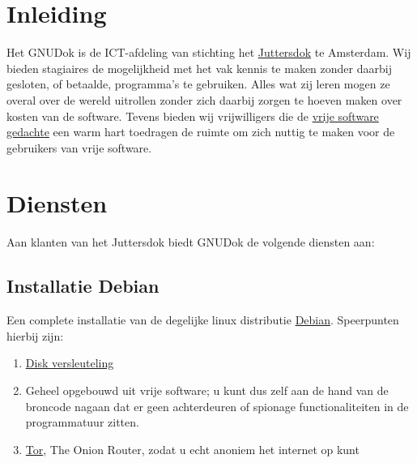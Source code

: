 
\section{Inleiding}

Het GNUDok is de ICT-afdeling van stichting het \href{http://www.juttersdok.nl/}{Juttersdok} te Amsterdam. Wij bieden stagiaires de mogelijkheid met het vak kennis te maken zonder daarbij gesloten, of betaalde, programma's te gebruiken. Alles wat zij leren mogen ze overal over de wereld uitrollen zonder zich daarbij zorgen te hoeven maken over kosten van de software. Tevens bieden wij vrijwilligers die de \href{http://www.fsf.org/}{vrije software gedachte} een warm hart toedragen de ruimte om zich nuttig te maken voor de gebruikers van vrije software.

\section{Diensten}

Aan klanten van het Juttersdok biedt GNUDok de volgende diensten aan:

\subsection{Installatie Debian}

Een complete installatie van de degelijke linux distributie \href{https://www.debian.org/}{Debian}.
Speerpunten hierbij zijn:

\begin{enumerate}
	\item \href{https://wiki.archlinux.org/index.php/Disk_encryption}{Disk versleuteling}
		\item Geheel opgebouwd uit vrije software; u kunt dus zelf aan de hand van de broncode nagaan dat er geen achterdeuren of spionage functionaliteiten in de programmatuur zitten.
		\item \href{https://www.torproject.org}{Tor}, The Onion Router, zodat u echt anoniem het internet op kunt
\end{enumerate}


